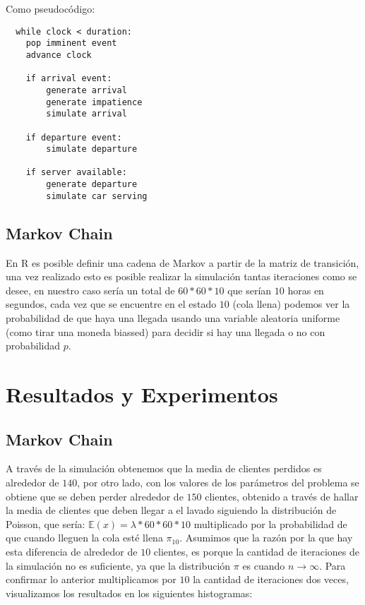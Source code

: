 \documentclass[14pt]{extarticle}
\begin{document}
Como pseudocódigo:

\begin{verbatim}
  while clock < duration:
    pop imminent event
    advance clock

    if arrival event:
        generate arrival
        generate impatience
        simulate arrival
    
    if departure event:
        simulate departure

    if server available:
        generate departure
        simulate car serving  
\end{verbatim}

\subsection{Markov Chain}

En R es posible definir una cadena de Markov a partir de la matriz de transición, una vez realizado esto es posible realizar la simulación tantas iteraciones como se desee, en nuestro caso sería un total de $60 * 60 * 10$ que serían $10$ horas en segundos, cada vez que se encuentre en el estado $10$ (cola llena) podemos ver la probabilidad de que haya una llegada usando una variable aleatoria uniforme (como tirar una moneda biassed) para decidir si hay una llegada o no con probabilidad $p$.

\section{Resultados y Experimentos}

\subsection{Markov Chain}

    A través de la simulación obtenemos que la media de clientes perdidos es alrededor de $140$, por otro lado, con los valores de los parámetros del problema se obtiene que se deben perder alrededor de $150$ clientes, obtenido a través de hallar la media de clientes que deben llegar a el lavado siguiendo la distribución de Poisson, que sería: $\mathbb{E}(x) = \lambda * 60 * 60 * 10$ multiplicado por la probabilidad de que cuando lleguen la cola esté llena $\pi_{10}$. Asumimos que la razón por la que hay esta diferencia de alrededor de $10$ clientes, es porque la cantidad de iteraciones de la simulación no es suficiente, ya que la distribución $\pi$ es cuando $n \to \infty$. Para confirmar lo anterior multiplicamos por $10$ la cantidad de iteraciones dos veces, visualizamos los resultados en los siguientes histogramas:
\end{document}
